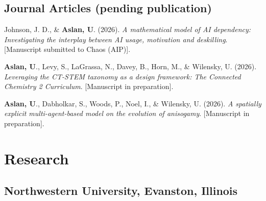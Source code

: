 \documentclass[11pt,letterpaper]{report} %
\begin{document}
    \subsection*{Journal Articles (pending publication)}

    \begin{tablist}

        \item[] \tab{}Johnson, J. D., \& \textbf{Aslan, U}. (2026). \textit{A mathematical model of AI dependency: Investigating the interplay between AI usage, motivation and deskilling}. [Manuscript submitted to Chaos (AIP)].

        \item[] \tab{}\textbf{Aslan, U}., Levy, S., LaGrassa, N., Davey, B., Horn, M., \& Wilensky, U. (2026). \textit{Leveraging the CT-STEM taxonomy as a design framework: The Connected Chemistry 2 Curriculum}. [Manuscript in preparation].

        \item[] \tab{}\textbf{Aslan, U}., Dabholkar, S., Woods, P., Noel, I., \& Wilensky, U. (2026). \textit{A spatially explicit multi-agent-based model on the evolution of anisogamy}. [Manuscript in preparation].

    \end{tablist}




    \section*{Research}

    \subsection*{Northwestern University, Evanston, Illinois}
\end{document}
